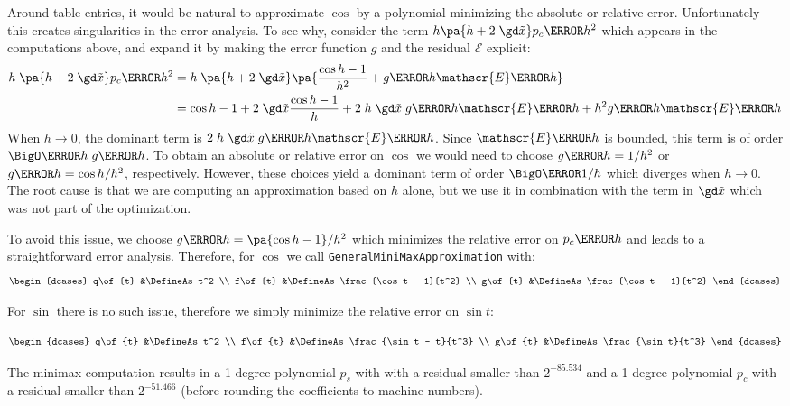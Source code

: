 \documentclass[10pt, a4paper, twoside]{basestyle}
\newcommand{\red}[1]{\tilde{#1}}
\begin{document}
Around table entries, it would be natural to approximate $\cos$ by a polynomial minimizing the absolute or relative error.  Unfortunately this creates singularities in the error analysis.  To see why, consider the term $h \pa{h + 2 \; \gd \red x} p_c\of{h^2}$ which appears in the computations above, and expand it by making the error function $g$ and the residual $\mathscr{E}$ explicit:
\begin{align*}
h \; \pa{h + 2 \; \gd \red x} p_c\of{h^2} &= h \; \pa{h + 2 \; \gd \red x} \pa{\frac{\cos h - 1}{h^2} + g\of{h} \mathscr{E}\of{h}} \\
&= \cos h - 1 + 2 \; \gd \red x \frac{\cos h - 1}{h} + 2 \; h \; \gd \red x \; g\of{h} \mathscr{E}\of{h} + h^2 g\of{h} \mathscr{E}\of{h}
\end{align*}
When $h \to 0$, the dominant term is $2 \; h \; \gd \red x \; g\of{h} \mathscr{E}\of{h}$.  Since $\mathscr{E}\of{h}$ is bounded, this term is of order $\BigO\of{h \; g\of{h}}$.  To obtain an absolute or relative error on $\cos$ we would need to choose $g\of{h} = 1/h^2$ or $g\of{h} = \cos h/h^2$, respectively.  However, these choices yield a dominant term of order $\BigO\of{1/h}$ which diverges when $h \to 0$.  The root cause is that we are computing an approximation based on $h$ alone, but we use it in combination with the term in $\gd \red x$ which was not part of the optimization.

To avoid this issue, we choose $g\of{h} = \pa{\cos h - 1}/h^2$ which minimizes the relative error on $p_c\of{h}$ and leads to a straightforward error analysis.  Therefore, for $\cos$ we call \texttt{GeneralMiniMaxApproximation} with:
\[
\begin{dcases}
q\of{t} &\DefineAs t^2 \\
f\of{t} &\DefineAs \frac{\cos t - 1}{t^2} \\
g\of{t} &\DefineAs \frac{\cos t - 1}{t^2}
\end{dcases}
\]

For $\sin$ there is no such issue, therefore we simply minimize the relative error on $\sin t$:

\[
\begin{dcases}
q\of{t} &\DefineAs t^2 \\
f\of{t} &\DefineAs \frac{\sin t - t}{t^3} \\
g\of{t} &\DefineAs \frac{\sin t}{t^3}
\end{dcases}
\]

The minimax computation results in a 1-degree polynomial $p_s$ with with a residual smaller than $2^{-85.534}$ and a 1-degree polynomial $p_c$ with a residual smaller than $2^{-51.466}$ (before rounding the coefficients to machine numbers).
\end{document}
